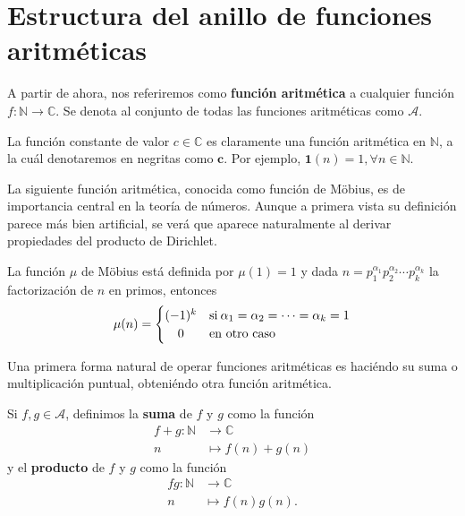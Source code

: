 \newpage
{}
\section{Estructura del anillo de funciones aritméticas}

\begin{definition}
A partir de ahora, nos referiremos como \textbf{función aritmética} a cualquier función $f : \mathbb{N} \longrightarrow \mathbb{C}$. Se denota al conjunto de todas las funciones aritméticas como $\mathcal{A}$.
\end{definition}

\begin{definition}
La función constante de valor $c \in \mathbb{C}$ es claramente una función aritmética en $\mathbb{N}$, a la cuál denotaremos en negritas como $\mathbf{c}$. Por ejemplo, $\mathbf{1}(n)=1, \forall n \in \mathbb{N}$.
\end{definition}

La siguiente función aritmética, conocida como función de Möbius, es de importancia central en la teoría de números. Aunque a primera vista su definición parece más bien artificial, se verá que aparece naturalmente al derivar propiedades del producto de Dirichlet.

\begin{definition}
La función $\mu$ de Möbius está definida por $\mu(1)=1$ y dada $n=p_1^{\alpha_1}p_2^{\alpha_2}\cdots p_k^{\alpha_k}$ la factorización de $n$ en primos, entonces
\begin{equation*}
	\mu(n) =
		\begin{cases}
			(-1)^k & \text{si} \: \alpha_1=\alpha_2=\cdots=\alpha_k=1 \\ \hfil
			0 & \text{en otro caso} \: 
		\end{cases}
\end{equation*}
\end{definition}

Una primera forma natural de operar funciones aritméticas es haciéndo su suma o multiplicación puntual, obteniéndo otra función aritmética.

\begin{definition}
Si $f,g \in \mathcal{A}$, definimos la \textbf{suma} de $f$ y $g$ como la función \begin{align*}
    f+g : \mathbb{N} & \longrightarrow \mathbb{C} \\
    n & \longmapsto f(n)+g(n)
\end{align*}
y el \textbf{producto} de $f$ y $g$ como la función
\begin{align*}
    fg : \mathbb{N} & \longrightarrow \mathbb{C} \\
    n & \longmapsto f(n)g(n).
\end{align*}
\end{definition}

